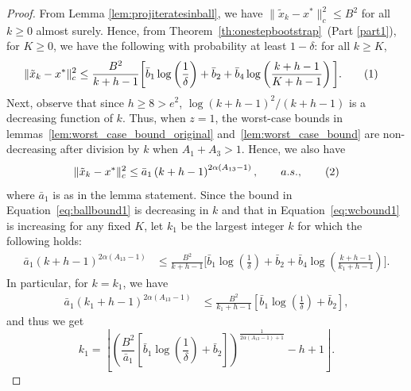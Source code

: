 \documentclass{article}
\newcommand{\numberthis}{\addtocounter{equation}{1}\tag{\theequation}}
\newcommand{\lrp}[1]{\left( #1 \right)}
\begin{document}
\begin{proof}
From Lemma \ref{lem:projiteratesinball}, we have $\|\tilde{x}_k - x^*\|^2_c \le B^2$ for all $k\ge 0$ almost surely. Hence, from Theorem~\ref{th:onestepbootstrap}~(Part \ref{part1}), for $K\ge 0$, we have the following with probability at least $1-\delta$:  for all $k\ge K$, 
\begin{align*}
\|\tilde{x}_k - x^* \|_c^2 &\leq \frac{B^2}{k+h-1} \bigg[\bar{b}_1\log\left(\frac{1}{\delta}\right) + \bar{b}_2 + \bar{b}_4 \log\left(\frac{k+h-1}{K+h-1}\right)\bigg].\numberthis\label{eq:ballbound1}
\end{align*}
Next, observe that since $h \geq 8 > e^2$, $\log(k+h-1)^2/(k+h-1)$ is a decreasing function of $k$. Thus, when $z=1$, the worst-case bounds in lemmas~\ref{lem:worst_case_bound_original} and~\ref{lem:worst_case_bound} are non-decreasing after division by $k$ when $A_{1} + A_3 > 1$. Hence, we also have 
\[ \|\tilde{x}_{k} - x^*\|^2_c \leq \bar{a}_1 \lrp{k+h-1}^{2\alpha (A_{13} - 1)}, \qquad a.s., \numberthis\label{eq:wcbound1} \]
where $\bar{a}_1$ is as in the lemma statement. 
Since the bound in Equation~\eqref{eq:ballbound1} is decreasing in $k$ and that in Equation~\eqref{eq:wcbound1} is increasing for any fixed $K$, let $k_1$ be the largest integer $k$ for which the following holds:
\begin{align*}
    \bar{a}_1 \lrp{k+h-1}^{2\alpha (A_{13} - 1)} &\leq \frac{B^2}{k+h-1} \bigg[\bar{b}_1\log\left(\frac{1}{\delta}\right) + \bar{b}_2 + \bar{b}_4 \log\left(\frac{k+h-1}{k_1+h-1}\right)\bigg].
\end{align*}
In particular, for $k=k_1$, we have
\begin{align*}
    \bar{a}_1 \lrp{k_1+h-1}^{2\alpha \lrp{A_{13}-1}} &\leq \frac{B^2}{k_1+h-1} \left[\bar{b}_1\log\left(\frac{1}{\delta}\right) + \bar{b}_2 \right], 
\end{align*}
and thus we get
\[ k_1 = \left\lfloor \left( \frac{B^2}{\bar{a}_1} \left[\bar{b}_1\log\left(\frac{1}{\delta}\right) + \bar{b}_2 \right]  \right)^\frac{1}{2\alpha (A_{13} - 1) + 1} -h + 1 \right\rfloor. \]


\end{proof}
\end{document}
